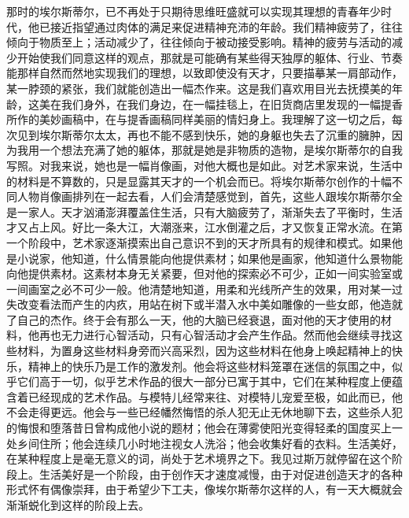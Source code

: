 \par 那时的埃尔斯蒂尔，已不再处于只期待思维旺盛就可以实现其理想的青春年少时代，他已接近指望通过肉体的满足来促进精神充沛的年龄。我们精神疲劳了，往往倾向于物质至上；活动减少了，往往倾向于被动接受影响。精神的疲劳与活动的减少开始使我们同意这样的观点，那就是可能确有某些得天独厚的躯体、行业、节奏能那样自然而然地实现我们的理想，以致即使没有天才，只要描摹某一肩部动作，某一脖颈的紧张，我们就能创造出一幅杰作来。这是我们喜欢用目光去抚摸美的年龄，这美在我们身外，在我们身边，在一幅挂毯上，在旧货商店里发现的一幅提香所作的美妙画稿中，在与提香画稿同样美丽的情妇身上。我理解了这一切之后，每次见到埃尔斯蒂尔太太，再也不能不感到快乐，她的身躯也失去了沉重的臃肿，因为我用一个想法充满了她的躯体，那就是她是非物质的造物，是埃尔斯蒂尔的自我写照。对我来说，她也是一幅肖像画，对他大概也是如此。对艺术家来说，生活中的材料是不算数的，只是显露其天才的一个机会而已。将埃尔斯蒂尔创作的十幅不同人物肖像画排列在一起去看，人们会清楚感觉到，首先，这些人跟埃尔斯蒂尔全是一家人。天才汹涌澎湃覆盖住生活，只有大脑疲劳了，渐渐失去了平衡时，生活才又占上风。好比一条大江，大潮涨来，江水倒灌之后，才又恢复正常水流。在第一个阶段中，艺术家逐渐摸索出自己意识不到的天才所具有的规律和模式。如果他是小说家，他知道，什么情景能向他提供素材；如果他是画家，他知道什么景物能向他提供素材。这素材本身无关紧要，但对他的探索必不可少，正如一间实验室或一间画室之必不可少一般。他清楚地知道，用柔和光线所产生的效果，用对某一过失改变看法而产生的内疚，用站在树下或半潜入水中美如雕像的一些女郎，他造就了自己的杰作。终于会有那么一天，他的大脑已经衰退，面对他的天才使用的材料，他再也无力进行心智活动，只有心智活动才会产生作品。然而他会继续寻找这些材料，为置身这些材料身旁而兴高采烈，因为这些材料在他身上唤起精神上的快乐，精神上的快乐乃是工作的激发剂。他会将这些材料笼罩在迷信的氛围之中，似乎它们高于一切，似乎艺术作品的很大一部分已寓于其中，它们在某种程度上便蕴含着已经现成的艺术作品。与模特儿经常来往、对模特儿宠爱至极，如此而已，他不会走得更远。他会与一些已经幡然悔悟的杀人犯无止无休地聊下去，这些杀人犯的悔恨和堕落昔日曾构成他小说的题材；他会在薄雾使阳光变得轻柔的国度买上一处乡间住所；他会连续几小时地注视女人洗浴；他会收集好看的衣料。生活美好，在某种程度上是毫无意义的词，尚处于艺术境界之下。我见过斯万就停留在这个阶段上。生活美好是一个阶段，由于创作天才速度减慢，由于对促进创造天才的各种形式怀有偶像崇拜，由于希望少下工夫，像埃尔斯蒂尔这样的人，有一天大概就会渐渐蜕化到这样的阶段上去。
